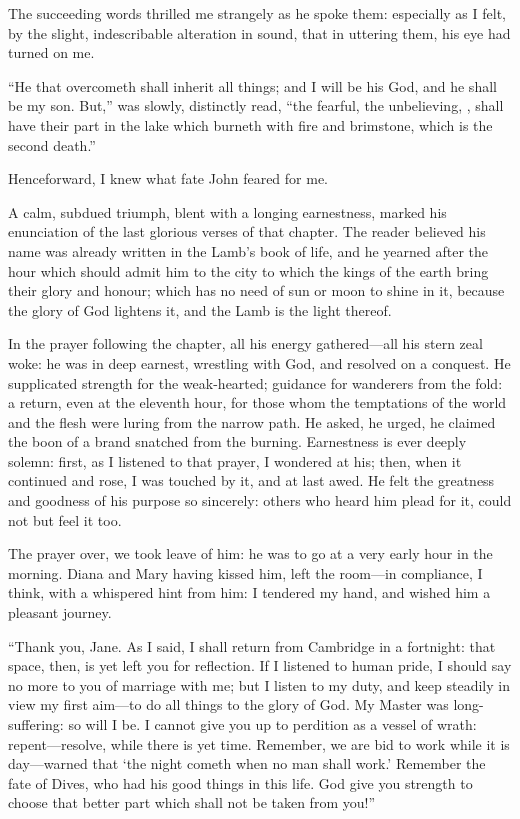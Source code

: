 The succeeding words thrilled me strangely as he spoke them: especially
as I felt, by the slight, indescribable alteration in sound, that in
uttering them, his eye had turned on me.

\enquote{He that overcometh shall inherit all things; and I will be his
God, and he shall be my son. But,} was slowly, distinctly read,
\enquote{the fearful, the unbelieving, \etc, shall have their part in
the lake which burneth with fire and brimstone, which is the second
death.}

Henceforward, I knew what fate \St{} John feared for me.

A calm, subdued triumph, blent with a longing earnestness, marked his
enunciation of the last glorious verses of that chapter. The reader
believed his name was already written in the Lamb's book of life, and he
yearned after the hour which should admit him to the city to which the
kings of the earth bring their glory and honour; which has no need of
sun or moon to shine in it, because the glory of God lightens it, and
the Lamb is the light thereof.

In the prayer following the chapter, all his energy gathered---all his
stern zeal woke: he was in deep earnest, wrestling with God, and
resolved on a conquest. He supplicated strength for the weak-hearted;
guidance for wanderers from the fold: a return, even at the eleventh
hour, for those whom the temptations of the world and the flesh were
luring from the narrow path. He asked, he urged, he claimed the boon of
a brand snatched from the burning. Earnestness is ever deeply solemn:
first, as I listened to that prayer, I wondered at his; then, when it
continued and rose, I was touched by it, and at last awed. He felt the
greatness and goodness of his purpose so sincerely: others who heard him
plead for it, could not but feel it too.

The prayer over, we took leave of him: he was to go at a very early hour
in the morning. Diana and Mary having kissed him, left the room---in
compliance, I think, with a whispered hint from him: I tendered my hand,
and wished him a pleasant journey.

\enquote{Thank you, Jane. As I said, I shall return from Cambridge in a
fortnight: that space, then, is yet left you for reflection. If I
listened to human pride, I should say no more to you of marriage with
me; but I listen to my duty, and keep steadily in view my first aim---to
do all things to the glory of God. My Master was long-suffering: so
will I be. I cannot give you up to perdition as a vessel of wrath:
repent---resolve, while there is yet time. Remember, we are bid to work
while it is day---warned that \enquote{the night cometh when no man
shall work.} Remember the fate of Dives, who had his good things in
this life. God give you strength to choose that better part which shall
not be taken from you!}

